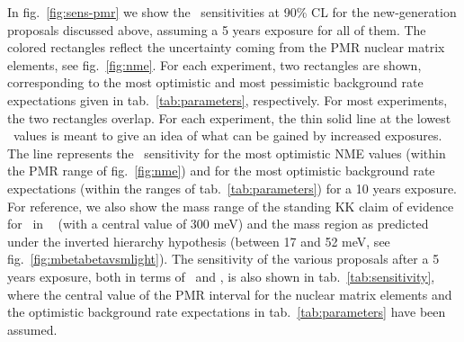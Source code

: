 In fig.~\ref{fig:sens-pmr} we show the \mbb\ sensitivities at 90\% CL for the new-generation proposals discussed above, assuming a 5 years exposure for all of them. The colored rectangles reflect the uncertainty coming from the PMR nuclear matrix elements, see fig.~\ref{fig:nme}. For each experiment, two rectangles are shown, corresponding to the most optimistic and most pessimistic background rate expectations given in tab.~\ref{tab:parameters}, respectively. For most experiments, the two rectangles overlap. For each experiment, the thin solid line at the lowest \mbb\ values is meant to give an idea of what can be gained by increased exposures. The line represents the \mbb\ sensitivity for the most optimistic NME values (within the PMR range of fig.~\ref{fig:nme}) and for the most optimistic background rate expectations (within the ranges of tab.~\ref{tab:parameters}) for a 10 years exposure. For reference, we also show the mass range of the standing KK claim of evidence for \bbonu\ in \GE\ \cite{Klapdor-Kleingrothaus:2006zcr} (with a central value of 300 meV) and the mass region as predicted under the inverted hierarchy hypothesis (between 17 and 52 meV, see fig.~\ref{fig:mbetabetavsmlight}). The sensitivity of the various proposals after a 5 years exposure, both in terms of \Tonu\ and \mbb, is also shown in tab.~\ref{tab:sensitivity}, where the central value of the PMR interval for the nuclear matrix elements and the optimistic background rate expectations in tab.~\ref{tab:parameters} have been assumed.


